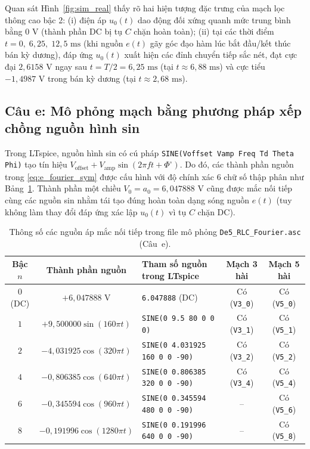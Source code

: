Quan sát Hình~\ref{fig:sim_real} thấy rõ hai hiện tượng đặc trưng của mạch lọc thông cao bậc 2: (i) điện áp $u_0(t)$ dao động đối xứng quanh mức trung bình bằng $0\text{ V}$ (thành phần DC bị tụ $C$ chặn hoàn toàn); (ii) tại các thời điểm $t = 0,\; 6{,}25,\; 12{,}5\text{ ms}$ (khi nguồn $e(t)$ gãy góc đạo hàm lúc bắt đầu/kết thúc bán kỳ dương), đáp ứng $u_0(t)$ xuất hiện các đỉnh chuyển tiếp sắc nét, đạt cực đại $2{,}6158\text{ V}$ ngay sau $t = T/2 = 6{,}25\text{ ms}$ (tại $t \approx 6{,}88\text{ ms}$) và cực tiểu $-1{,}4987\text{ V}$ trong bán kỳ dương (tại $t \approx 2{,}68\text{ ms}$).

\subsection{Câu e: Mô phỏng mạch bằng phương pháp xếp chồng nguồn hình sin}

Trong LTspice, nguồn hình sin có cú pháp \texttt{SINE(Voffset Vamp Freq Td Theta Phi)} tạo tín hiệu $V_{\text{offset}} + V_{\text{amp}}\sin(2\pi f t + \Phi^\circ)$. Do đó, các thành phần nguồn trong \eqref{eq:e_fourier_sym} được cấu hình với độ chính xác 6 chữ số thập phân như Bảng~\ref{tab:ltspice_sources}. Thành phần một chiều $V_0 = a_0 = 6{,}047888\text{ V}$ cũng được mắc nối tiếp cùng các nguồn sin nhằm tái tạo đúng hoàn toàn dạng sóng nguồn $e(t)$ (tuy không làm thay đổi đáp ứng xác lập $u_0(t)$ vì tụ $C$ chặn DC).

\begin{table}[!htbp]
    \centering
    \caption{Thông số các nguồn áp mắc nối tiếp trong file mô phỏng \texttt{De5\_RLC\_Fourier.asc} (Câu~e).}
    \label{tab:ltspice_sources}
    \vspace{4pt}
    \small
    \begin{tabular}{|c|c|l|c|c|}
        \toprule
        \textbf{Bậc $n$} & \textbf{Thành phần nguồn} & \textbf{Tham số nguồn trong LTspice} & \textbf{Mạch 3 hài} & \textbf{Mạch 5 hài} \\
        \midrule
        $0$ (DC) & $+6{,}047888\text{ V}$            & \texttt{6.047888} (DC)                  & Có (\texttt{V3\_0}) & Có (\texttt{V5\_0}) \\
        $1$      & $+9{,}500000\sin(160\pi t)$       & \texttt{SINE(0 9.5 80 0 0 0)}           & Có (\texttt{V3\_1}) & Có (\texttt{V5\_1}) \\
        $2$      & $-4{,}031925\cos(320\pi t)$       & \texttt{SINE(0 4.031925 160 0 0 -90)}   & Có (\texttt{V3\_2}) & Có (\texttt{V5\_2}) \\
        $4$      & $-0{,}806385\cos(640\pi t)$       & \texttt{SINE(0 0.806385 320 0 0 -90)}   & Có (\texttt{V3\_4}) & Có (\texttt{V5\_4}) \\
        $6$      & $-0{,}345594\cos(960\pi t)$       & \texttt{SINE(0 0.345594 480 0 0 -90)}   & --                  & Có (\texttt{V5\_6}) \\
        $8$      & $-0{,}191996\cos(1280\pi t)$      & \texttt{SINE(0 0.191996 640 0 0 -90)}   & --                  & Có (\texttt{V5\_8}) \\
        \bottomrule
    \end{tabular}
\end{table}

